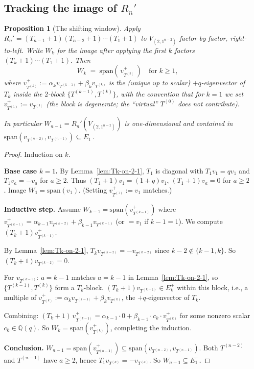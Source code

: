 \documentclass[11pt]{article}
\newtheorem{proposition}[theorem]{Proposition}
\theoremstyle{definition}
\begin{document}
\subsection{Tracking the image of $R_n'$}

\begin{proposition}[The shifting window]\label{prop:shifting}
Apply $R_n'=(T_{n-1}{+}1)(T_{n-2}{+}1)\cdots(T_1{+}1)$ to $V_{(2,1^{n-2})}$
factor by factor, right-to-left.  Write $W_k$ for the image after
applying the first $k$ factors $(T_k{+}1)\cdots(T_1{+}1)$.  Then
\begin{equation}\label{eq:window}
   W_k \;=\; \mathrm{span}(\,v_{T^{(k)}}^+\,)
   \quad\text{for $k\ge 1$,}
\end{equation}
where $v_{T^{(k)}}^+ := \alpha_k v_{T^{(k-1)}}+\beta_k v_{T^{(k)}}$ is
the (unique up to scalar) $+q$-eigenvector of $T_k$ inside the
$2$-block $\{T^{(k-1)},T^{(k)}\}$, with the convention that for $k=1$
we set $v_{T^{(1)}}^+ := v_{T^{(1)}}$ (the block is degenerate; the
``virtual'' $T^{(0)}$ does not contribute).

In particular $W_{n-1}=R_n'(V_{(2,1^{n-2})})$ is one-dimensional and
contained in $\mathrm{span}(v_{T^{(n-2)}},v_{T^{(n-1)}})\subseteq E_1^-$.
\end{proposition}

\begin{proof}
Induction on $k$.

\textbf{Base case $k=1$.}  By Lemma~\ref{lem:Tk-on-2-1}, $T_1$ is
diagonal with $T_1v_1=qv_1$ and $T_1v_a=-v_a$ for $a\ge 2$.  Thus
$(T_1{+}1)v_1=(1{+}q)v_1$, $(T_1{+}1)v_a=0$ for $a\ge 2$.  Image
$W_1=\mathrm{span}(v_1)$. (Setting $v_{T^{(1)}}^+:=v_1$ matches.)

\textbf{Inductive step.}  Assume $W_{k-1}=\mathrm{span}(v_{T^{(k-1)}}^+)$ where
$v_{T^{(k-1)}}^+=\alpha_{k-1}v_{T^{(k-2)}}+\beta_{k-1}v_{T^{(k-1)}}$
(or $=v_1$ if $k-1=1$).  We compute $(T_k{+}1)v_{T^{(k-1)}}^+$.

By Lemma~\ref{lem:Tk-on-2-1}, $T_kv_{T^{(k-2)}}=-v_{T^{(k-2)}}$ since
$k-2\not\in\{k-1,k\}$.  So $(T_k{+}1)v_{T^{(k-2)}}=0$.

For $v_{T^{(k-1)}}$: $a=k-1$ matches $a=k-1$ in
Lemma~\ref{lem:Tk-on-2-1}, so $\{T^{(k-1)},T^{(k)}\}$ form a
$T_k$-block.  $(T_k{+}1)v_{T^{(k-1)}}\in E_k^+$ within this block,
i.e., a multiple of $v_{T^{(k)}}^+ :=
\alpha_k v_{T^{(k-1)}}+\beta_k v_{T^{(k)}}$, the $+q$-eigenvector of
$T_k$.

Combining: $(T_k{+}1)\,v_{T^{(k-1)}}^+ =
\alpha_{k-1}\cdot 0 + \beta_{k-1}\cdot c_k\cdot v_{T^{(k)}}^+$ for
some nonzero scalar $c_k\in\mathbb{Q}(q)$.  So $W_k=
\mathrm{span}(v_{T^{(k)}}^+)$, completing the induction.

\textbf{Conclusion.}  $W_{n-1}=\mathrm{span}(v_{T^{(n-1)}}^+)\subseteq
\mathrm{span}(v_{T^{(n-2)}},v_{T^{(n-1)}})$.  Both $T^{(n-2)}$ and
$T^{(n-1)}$ have $a\ge 2$, hence $T_1v_{T^{(a)}}=-v_{T^{(a)}}$.  So
$W_{n-1}\subseteq E_1^-$.
\end{proof}
\end{document}
